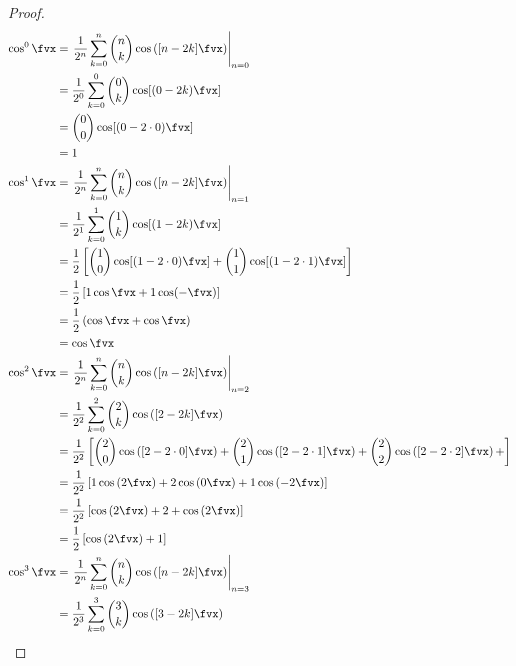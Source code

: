 \begin{proof}
\begin{align*}
  \cos^0\fvx
    &= \left.\frac{1}{2^n} \sum_{k=0}^n {n\choose k}\cos\left([n-2k]\fvx\right)\right|_{n=0}
  \\&= \frac{1}{2^0} \sum_{k=0}^0 {0\choose k}\cos[(0-2k)\fvx] 
  \\&= {0\choose 0}\cos[(0-2\cdot0)\fvx] 
  \\&= 1
  \\
  \cos^1\fvx
    &= \left.\frac{1}{2^n} \sum_{k=0}^n {n\choose k}\cos\left([n-2k]\fvx\right)\right|_{n=1}
  \\&= \frac{1}{2^1} \sum_{k=0}^1 {1\choose k}\cos[(1-2k)\fvx] 
  \\&= \frac{1}{2}\left[ {1\choose 0}\cos[(1-2\cdot0)\fvx] + {1\choose 1}\cos[(1-2\cdot1)\fvx] \right]
  \\&= \frac{1}{2}\left[ 1\cos\fvx + 1\cos(-\fvx) \right]
  \\&= \frac{1}{2}\left( \cos\fvx + \cos\fvx \right)
  \\&= \cos\fvx
  \\
  \cos^2\fvx
    &= \left.\frac{1}{2^n} \sum_{k=0}^n {n\choose k}\cos\left([n-2k]\fvx\right)\right|_{n=2}
  \\&= \frac{1}{2^2} \sum_{k=0}^2 {2\choose k}\cos\left([2-2k]\fvx\right)
  \\&= \frac{1}{2^2}\left[ 
         {2\choose 0}\cos\left([2-2\cdot0]\fvx\right) +
         {2\choose 1}\cos\left([2-2\cdot1]\fvx\right) +
         {2\choose 2}\cos\left([2-2\cdot2]\fvx\right) +
       \right]
  \\&= \frac{1}{2^2}\left[ 
         1\cos\left(2\fvx\right) +
         2\cos\left(0\fvx\right) +
         1\cos\left(-2\fvx\right) 
       \right]
  \\&= \frac{1}{2^2}\left[\cos\left(2\fvx\right) +  2 + \cos\left(2\fvx\right) \right]
  \\&= \frac{1}{2}\left[\cos\left(2\fvx\right) +  1\right]
  \\
  \cos^3\fvx
    &= \left.\frac{1}{2^n} \sum_{k=0}^n {n\choose k}\cos\left([n-2k]\fvx\right)\right|_{n=3}
  \\&= \frac{1}{2^3} \sum_{k=0}^3 {3\choose k}\cos\left([3-2k]\fvx\right)

\end{align*}
\end{proof}
